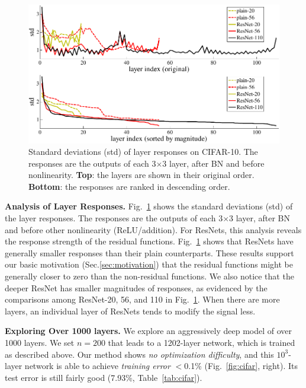 \documentclass[10pt,twocolumn,letterpaper]{article}
\begin{document}
\begin{figure}[t]
  \begin{center}
    \includegraphics[width=0.9\linewidth]{eps/std}
  \end{center}
  \vspace{-1.5em}
  \caption{Standard deviations (std) of layer responses on CIFAR-10. The responses are the outputs of each 3$\times$3 layer, after BN and before nonlinearity. \textbf{Top}: the layers are shown in their original order. \textbf{Bottom}: the responses are ranked in descending order.}
  \label{fig:std}
\end{figure}


\vspace{6pt}
\noindent\textbf{Analysis of Layer Responses.}
Fig.~\ref{fig:std} shows the standard deviations (std) of the layer responses. The responses are the outputs of each 3$\times$3 layer, after BN and before other nonlinearity (ReLU/addition). For ResNets, this analysis reveals the response strength of the residual functions.
Fig.~\ref{fig:std} shows that ResNets have generally smaller responses than their plain counterparts. These results support our basic motivation (Sec.\ref{sec:motivation}) that the residual functions might be generally closer to zero than the non-residual functions.
We also notice that the deeper ResNet has smaller magnitudes of responses, as evidenced by the comparisons among ResNet-20, 56, and 110 in Fig.~\ref{fig:std}. When there are more layers, an individual layer of ResNets tends to modify the signal less.

\vspace{6pt}
\noindent\textbf{Exploring Over 1000 layers.}
We explore an aggressively deep model of over 1000 layers. We set $n=200$ that leads to a 1202-layer network, which is trained as described above. Our method shows \emph{no optimization difficulty}, and this $10^3$-layer network is able to achieve \emph{training error} $<$0.1\% (Fig.~\ref{fig:cifar}, right). Its test error is still fairly good (7.93\%, Table~\ref{tab:cifar}).
\end{document}

